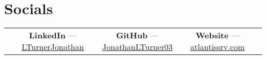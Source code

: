\documentclass[letterpaper,10pt]{article}
\begin{document}
\section{Socials}
\begin{center}
    \begin{tabular*}{\textwidth}{@{\extracolsep{\fill}} ccccc }
      \null &
      \textbf{LinkedIn} --- \href{https://linkedin.com/in/LTurnerJonathan}{LTurnerJonathan} &
      \textbf{GitHub} --- \href{https://github.com/JonathanLTurner03}{JonathanLTurner03} &
      \textbf{Website} --- \href{https://atlantissrv.com}{atlantissrv.com} & 
      \null \\
    \end{tabular*}
  \end{center}
\end{document}
